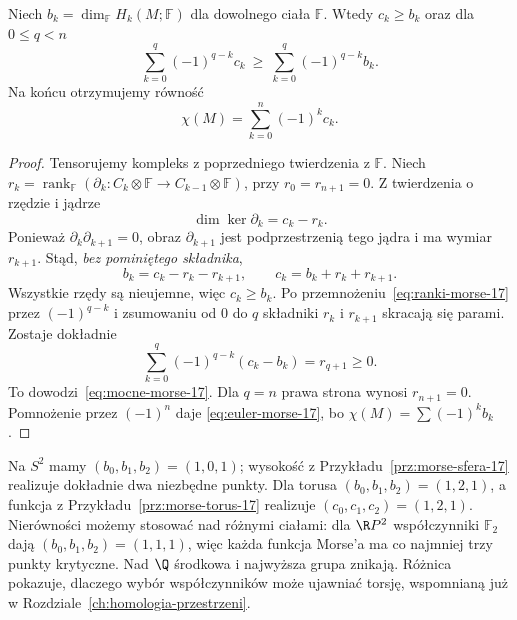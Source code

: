 \begin{twierdzenie}
\label{thm:nierownosci-morse-17}
Niech $b_k=\dim_{\mathbb F}H_k(M;\mathbb F)$
dla dowolnego ciała $\mathbb F$.
Wtedy $c_k\geq b_k$ oraz dla
$0\leq q<n$
\begin{equation}\label{eq:mocne-morse-17}
 \sum_{k=0}^q(-1)^{q-k}c_k
 \ \geq\
 \sum_{k=0}^q(-1)^{q-k}b_k.
\end{equation}
Na końcu otrzymujemy równość
\begin{equation}\label{eq:euler-morse-17}
 \chi(M)=\sum_{k=0}^n(-1)^kc_k.
\end{equation}
\end{twierdzenie}
\begin{proof}
Tensorujemy kompleks z poprzedniego
twierdzenia z $\mathbb F$.
Niech $r_k=\operatorname{rank}_{\mathbb F}
(\partial_k:C_k\otimes\mathbb F
\to C_{k-1}\otimes\mathbb F)$,
przy $r_0=r_{n+1}=0$.
Z twierdzenia o rzędzie i jądrze
\[
 \dim\ker\partial_k=c_k-r_k.
\]
Ponieważ $\partial_k\partial_{k+1}=0$,
obraz $\partial_{k+1}$ jest podprzestrzenią
tego jądra i ma wymiar $r_{k+1}$.
Stąd, \emph{bez pominiętego składnika},
\begin{equation}\label{eq:ranki-morse-17}
 b_k=c_k-r_k-r_{k+1},
 \qquad c_k=b_k+r_k+r_{k+1}.
\end{equation}
Wszystkie rzędy są nieujemne,
więc $c_k\geq b_k$.
Po przemnożeniu~\eqref{eq:ranki-morse-17}
przez $(-1)^{q-k}$ i zsumowaniu
od $0$ do $q$ składniki $r_k$
i $r_{k+1}$ skracają się parami.
Zostaje dokładnie
\[
 \sum_{k=0}^q(-1)^{q-k}(c_k-b_k)
   =r_{q+1}\geq0.
\]
To dowodzi~\eqref{eq:mocne-morse-17}.
Dla $q=n$ prawa strona wynosi
$r_{n+1}=0$. Pomnożenie
przez $(-1)^n$ daje
\eqref{eq:euler-morse-17},
bo $\chi(M)=\sum(-1)^kb_k$.
\end{proof}

\begin{przyklad}
Na $S^2$ mamy $(b_0,b_1,b_2)=(1,0,1)$;
wysokość z Przykładu~\ref{prz:morse-sfera-17}
realizuje dokładnie dwa niezbędne
punkty. Dla torusa
$(b_0,b_1,b_2)=(1,2,1)$,
a funkcja z
Przykładu~\ref{prz:morse-torus-17}
realizuje $(c_0,c_1,c_2)=(1,2,1)$.
Nierówności możemy stosować
nad różnymi ciałami: dla
$\R P^2$ współczynniki
$\mathbb F_2$ dają
$(b_0,b_1,b_2)=(1,1,1)$,
więc każda funkcja Morse'a
ma co najmniej trzy punkty
krytyczne. Nad $\Q$ środkowa
i najwyższa grupa znikają.
Różnica pokazuje, dlaczego
wybór współczynników może
ujawniać torsję, wspomnianą
już w
Rozdziale~\ref{ch:homologia-przestrzeni}.
\end{przyklad}


